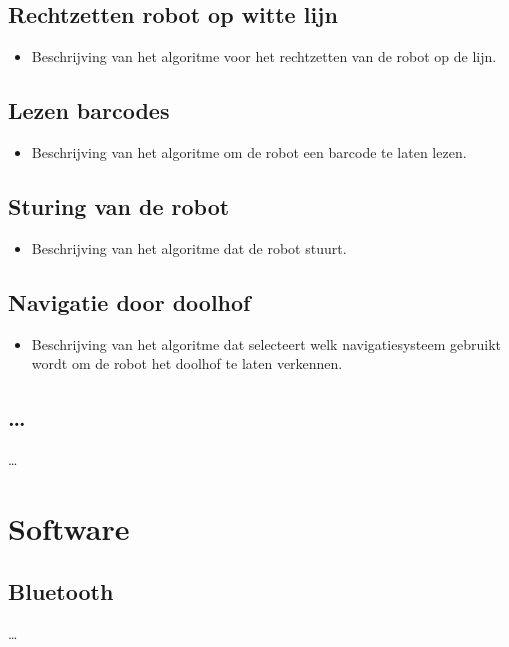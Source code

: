 \documentclass[tt1]{penoverslag}
\begin{document}
\subsection{Rechtzetten robot op witte lijn}
\begin{itemize}
\item Beschrijving van het algoritme voor het rechtzetten van de robot op de lijn.
\end{itemize}

\subsection{Lezen barcodes}
\begin{itemize}
\item Beschrijving van het algoritme om de robot een barcode te laten lezen.
\end{itemize}

\subsection{Sturing van de robot}
\begin{itemize}
\item Beschrijving van het algoritme dat de robot stuurt.
\end{itemize}

\subsection{Navigatie door doolhof}
\begin{itemize}
\item Beschrijving van het algoritme dat selecteert welk navigatiesysteem gebruikt wordt om de robot het doolhof te laten verkennen.
\end{itemize}

\subsection{\ldots}
\ldots


\section{Software}
\lipsum[5]

\subsection{Bluetooth}
\ldots
\end{document}
